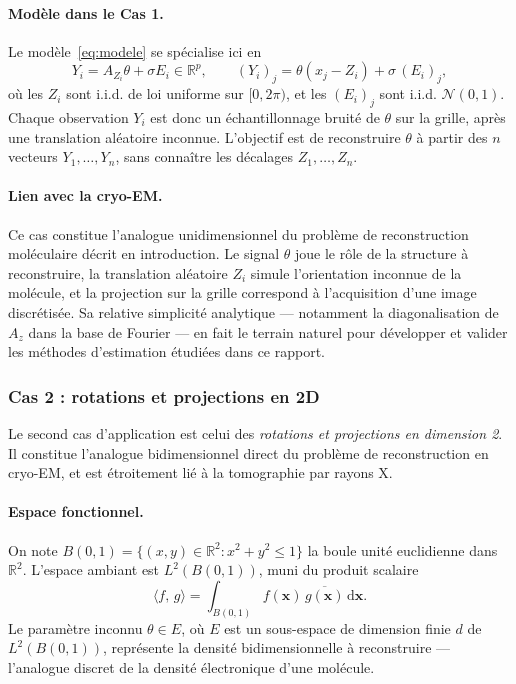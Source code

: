 \documentclass[12pt, a4paper]{article}
\theoremstyle{definition}
\newcommand{\R}{\mathbb{R}}
\newcommand{\Ncal}{\mathcal{N}}
\newcommand{\inner}[2]{\langle #1,\, #2 \rangle}
\begin{document}
\paragraph{Modèle dans le Cas 1.}
Le modèle~\eqref{eq:modele} se spécialise ici en
\[
    Y_i = A_{Z_i}\theta + \sigma E_i \in \R^p,
    \qquad (Y_i)_j = \theta(x_j - Z_i) + \sigma\,(E_i)_j,
\]
où les $Z_i$ sont i.i.d. de loi uniforme sur $[0, 2\pi)$, et les $(E_i)_j$
sont i.i.d. $\Ncal(0, 1)$. Chaque observation $Y_i$ est donc un échantillonnage
bruité de $\theta$ sur la grille, après une translation aléatoire inconnue.
L'objectif est de reconstruire $\theta$ à partir des $n$ vecteurs $Y_1, \ldots, Y_n$,
sans connaître les décalages $Z_1, \ldots, Z_n$.

\paragraph{Lien avec la cryo-EM.}
Ce cas constitue l'analogue unidimensionnel du problème de reconstruction
moléculaire décrit en introduction. Le signal $\theta$ joue le rôle de la structure
à reconstruire, la translation aléatoire $Z_i$ simule l'orientation inconnue de la
molécule, et la projection sur la grille correspond à l'acquisition d'une image
discrétisée. Sa relative simplicité analytique --- notamment la diagonalisation
de $A_z$ dans la base de Fourier --- en fait le terrain naturel pour développer
et valider les méthodes d'estimation étudiées dans ce rapport.

\subsubsection{Cas 2 : rotations et projections en 2D}
\label{subsubsec:cas2}

Le second cas d'application est celui des \textit{rotations et projections en
dimension 2}. Il constitue l'analogue bidimensionnel direct du problème de
reconstruction en cryo-EM, et est étroitement lié à la tomographie par rayons X.

\paragraph{Espace fonctionnel.}
On note $B(0,1) = \{(x,y) \in \R^2 : x^2 + y^2 \leq 1\}$ la boule unité
euclidienne dans $\R^2$. L'espace ambiant est $L^2(B(0,1))$, muni du produit
scalaire
\[
    \inner{f}{g} = \int_{B(0,1)} f(\mathbf{x})\,\overline{g(\mathbf{x})}\,\mathrm{d}\mathbf{x}.
\]
Le paramètre inconnu $\theta \in E$, où $E$ est un sous-espace de dimension
finie $d$ de $L^2(B(0,1))$, représente la densité bidimensionnelle à reconstruire
--- l'analogue discret de la densité électronique d'une molécule.
\end{document}
